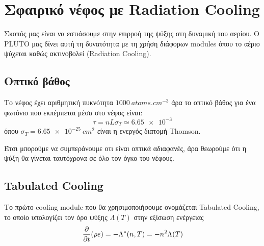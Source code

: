	\section{Σφαιρικό νέφος με Radiation Cooling}
	Σκοπός μας είναι να εστιάσουμε στην επιρροή της ψύξης στη δυναμική του αερίου. Ο PLUTO μας δίνει αυτή τη δυνατότητα με τη χρήση διάφορων modules όπου το αέριο ψύχεται καθώς ακτινοβολεί (Radiation Cooling). 

	\subsection{Οπτικό βάθος}
	Το νέφος έχει αριθμητική πυκνότητα $\SI{1000}{atoms.cm^{-3}}$ άρα το οπτικό βάθος για ένα φωτόνιο που εκπέμπεται μέσα στο νέφος είναι:
	\begin{equation}
	\tau = nL\sigma _T\simeq \num{6.65e-3}
	\end{equation}
	όπου $\sigma _T = \SI{6.65e-25}{cm^2}$ είναι η ενεργός διατομή Thomson.
	
	Έτσι μπορούμε να συμπεράνουμε οτι είναι οπτικά αδιαφανές, άρα θεωρούμε ότι η ψύξη θα γίνεται ταυτόχρονα σε όλο τον όγκο του νέφους. 
	
	\subsection{Tabulated Cooling}
	Το πρώτο cooling module που θα χρησιμοποιήσουμε ονομάζεται Tabulated Cooling, το οποίο υπολογίζει τον όρο ψύξης $\Lambda (T )$ στην εξίσωση ενέργειας 
	\begin{equation}
		\pdv{t}(\rho e)=-\Lambda^*(n,T)=-n^2 \Lambda(T)
	\end{equation}
	
